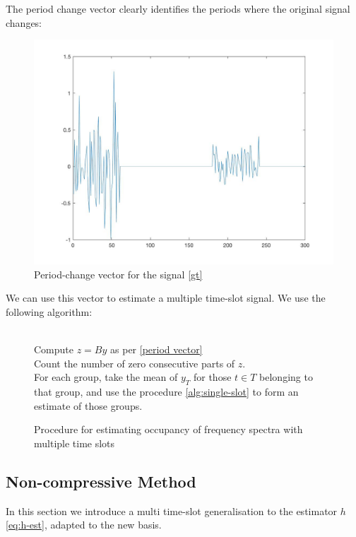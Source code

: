\begin{definition}
The period change vector clearly identifies the periods where the original signal changes:

\begin{figure}[h]
\centering
\includegraphics[height = 7.3 cm]{z-vec.jpg}
\caption{Period-change vector for the signal \ref{gt}}
\label{fig:period-vec}
\end{figure}

\end{definition}

We can use this vector to estimate a multiple time-slot signal. We use the following algorithm:

\begin{figure}
\begin{algorithmic}[1]
 \\
Compute \(z = By\) as per \eqref{period vector}
 \\
Count the number of zero consecutive parts of \(z\).
\\
For each group, take the mean of \(y_T\) for those \(t \in T\) belonging to that group, and use the procedure \ref{alg:single-slot} to form an estimate of those groups.
   	\EndProcedure
\end{algorithmic}
 \caption{Procedure for estimating occupancy of frequency spectra with multiple time slots}
 \label{alg:multiple-shot}
\end{figure}

\clearpage

\subsection{Non-compressive Method}
In this section we introduce a multi time-slot generalisation to the estimator \(h\) \eqref{eq:h-est}, adapted to the new basis.

